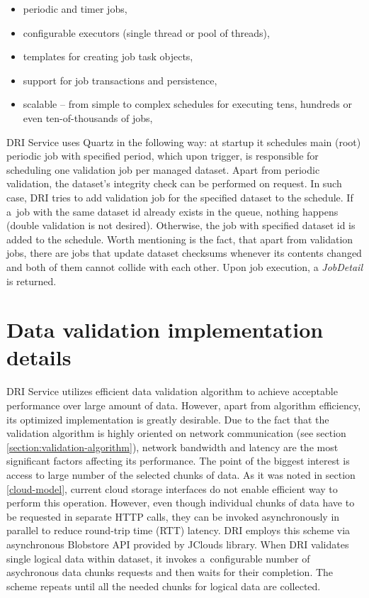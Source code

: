 \begin{itemize}
\item periodic and timer jobs,
\item configurable executors (single thread or pool of threads),
\item templates for creating job task objects,
\item support for job transactions and persistence, 
\item scalable -- from simple to complex schedules for executing tens, hundreds 
or even ten-of-thousands of jobs,
\end{itemize}

DRI Service uses Quartz in the following way: at startup it schedules main (root)
periodic job with specified period, which upon trigger, is responsible for scheduling
one validation job per managed dataset. Apart from periodic validation, the dataset's 
integrity check can be performed on request. In such case, DRI tries to add validation
job for the specified dataset to the schedule. If a~job with the same dataset id
already exists in the queue, nothing happens (double validation is not desired). Otherwise, 
the job with specified dataset id is added to the schedule. Worth mentioning is the fact,
that apart from validation jobs, there are jobs that update dataset checksums whenever its
contents changed and both of them cannot collide with each other. Upon job execution, a
\textit{JobDetail} is returned.

\section{Data validation implementation details}
DRI Service utilizes efficient data validation algorithm to achieve acceptable
performance over large amount of data. However, apart from algorithm
efficiency, its optimized implementation is greatly desirable. Due to the fact
that the validation algorithm is highly oriented on network communication (see
section \ref{section:validation-algorithm}), network bandwidth and latency are
the most significant factors affecting its performance. The point of the
biggest interest is access to large number of the selected chunks of data. As
it was noted in section \ref{cloud-model}, current cloud storage interfaces do
not enable efficient way to perform this operation. However, even though
individual chunks of data have to be requested in separate HTTP calls, they can
be invoked asynchronously in parallel to reduce round-trip time (RTT) latency.
DRI employs this scheme via asynchronous Blobstore API provided by JClouds
library. When DRI validates single logical data within dataset, it invokes
a~configurable number of asychronous data chunks requests and then waits for
their completion. The scheme repeats until all the needed chunks for logical
data are collected.\\

